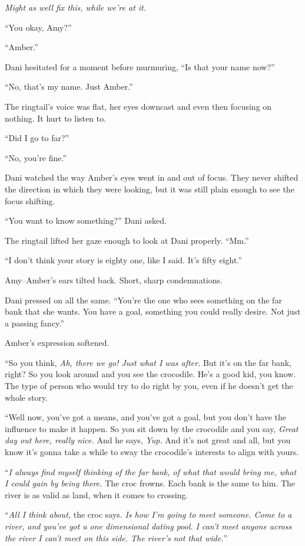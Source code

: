 \emph{Might as well fix this, while we're at it.}

``You okay, Amy?''

``Amber.''

Dani hesitated for a moment before murmuring, ``Is that your name now?''

``No, that's my name. Just Amber.''

The ringtail's voice was flat, her eyes downcast and even then focusing on nothing. It hurt to listen to.

``Did I go to far?''

``No, you're fine.''

Dani watched the way Amber's eyes went in and out of focus. They never shifted the direction in which they were looking, but it was still plain enough to see the focus shifting.

``You want to know something?'' Dani asked.

The ringtail lifted her gaze enough to look at Dani properly. ``Mm.''

``I don't think your story is eighty one, like I said. It's fifty eight.''

Amy--Amber's ears tilted back. Short, sharp condemnations.

Dani pressed on all the same. ``You're the one who sees something on the far bank that she wants. You have a goal, something you could really desire. Not just a passing fancy.''

Amber's expression softened.

``So you think, \emph{Ah, there we go! Just what I was after.} But it's on the far bank, right? So you look around and you see the crocodile. He's a good kid, you know. The type of person who would try to do right by you, even if he doesn't get the whole story.

``Well now, you've got a means, and you've got a goal, but you don't have the influence to make it happen. So you sit down by the crocodile and you say, \emph{Great day out here, really nice.} And he says, \emph{Yup.} And it's not great and all, but you know it's gonna take a while to sway the crocodile's interests to align with yours.

``\emph{I always find myself thinking of the far bank, of what that would bring me, what I could gain by being there.} The croc frowns. Each bank is the same to him. The river is as valid as land, when it comes to crossing.

``\emph{All I think about,} the croc says. \emph{Is how I'm going to meet someone. Come to a river, and you've got a one dimensional dating pool. I can't meet anyone across the river I can't meet on this side. The river's not that wide.}''

